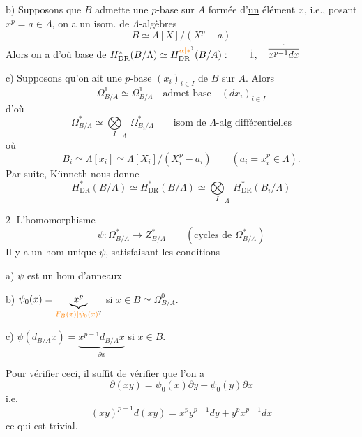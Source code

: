 b) Supposons que $B$ admette une $p$-base sur $A$ formée d'\uline{un} élément $x$, i.e.,  posant $x^p=a\in\Lambda$, on a un isom. de $\Lambda$-algèbres
\[
 B\simeq\Lambda[X]/(X^p-a)
\]
Alors on a
d'où base de \deleted{\unsure{$\Omega$}} $H^*_{\mathrm{DR}}(B/\Lambda)\simeq H^{\unsure{\alpha|*}}_{\mathrm{DR}}(B/A):\qquad\dot{1},\quad\overset{\cdot}{\overline{x^{p-1}dx}}$

c) Supposons qu'on ait une $p$-base $(x_i)_{i\in I}$ de $B$ sur $A$. Alors 
\[
 \Omega^1_{B/A}\simeq\Omega^1_{B/\Lambda}\quad\text{admet base}\quad (dx_i)_{i\in I}
\]
d'où
\[
 \Omega^*_{B/\Lambda}\simeq{\mathop{\bigotimes}\limits_I}_{\Lambda}\,\Omega^*_{B_i/\Lambda}
 \qquad\text{isom de $\Lambda$-alg différentielles}
\]
où
\[
 B_i\simeq\Lambda[x_i]\simeq\Lambda[X_i]/(X_i^p-a_i)
 \qquad (a_i=x_i^p\in\Lambda).
\]
Par suite, Künneth nous donne
\[
 H^*_{\mathrm{DR}}(B/A)\simeq H^*_{\mathrm{DR}}(B/\Lambda)
 \simeq{\mathop{\bigotimes}\limits_I}_{\Lambda}\,H^*_{\mathrm{DR}}(B_i/\Lambda)
\]

\textcircled{2} L'homomorphisme
\[
 \psi:\Omega^*_{B/A}\longrightarrow Z^*_{B/A}\qquad
 (\text{cycles de }\Omega^*_{B/A})
\]
Il y a un hom unique $\psi$, satisfaisant les conditions

a) $\psi$ est un hom d'anneaux

b) $\psi_0(x)=\underbrace{x^p}_{\unsure{F_B(x)|\psi_0(x)}}$ si $x\in B\simeq\Omega^0_{B/A}$.

c) $\psi(d_{B/A}x)=\underbrace{x^{p-1}d_{B/A}x}_{\partial x}$ si $x\in B$.

Pour vérifier ceci, il suffit de vérifier que l'on a
\[
 \partial(xy)=\psi_0(x)\partial y+\psi_0(y)\partial x
\]
i.e.
\[
 (xy)^{p-1}d(xy)=x^py^{p-1}dy+y^px^{p-1}dx
\]
ce qui est trivial.

